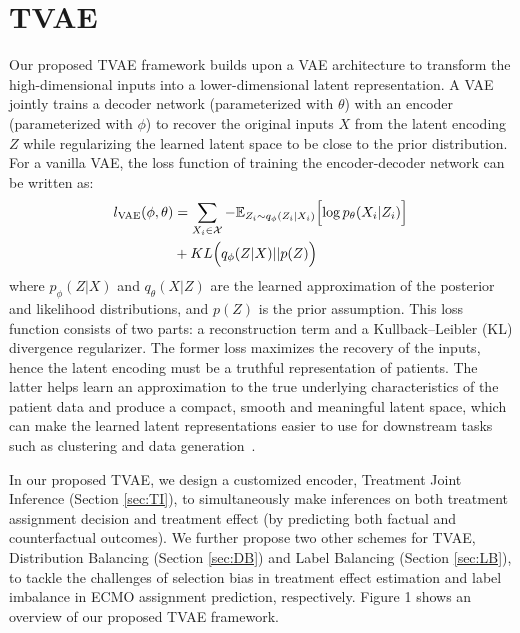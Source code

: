 

\section{TVAE}


Our proposed TVAE framework builds upon a VAE architecture to transform the high-dimensional inputs into a lower-dimensional latent representation. A VAE jointly trains a decoder network (parameterized with $\theta$) with an encoder (parameterized with $\phi$) to recover the original inputs $X$ from the latent encoding $Z$ while regularizing the learned latent space to be close to the prior distribution. For a vanilla VAE, the loss function of training the encoder-decoder network can be written as:
\begin{equation}
\label{eq:VAE}
    \begin{split}
    l_{\text{VAE}}(\phi,\theta) &= \sum_{X_i \in \mathcal{X}} -\mathbb{E}_{Z_i\sim q_{\phi}(Z_i|X_i) } \Bigl[ \log p_{\theta} (X_i|Z_i)\Bigr]  \\
    &+ KL\Bigl(q_{\phi}(Z|X) || p(Z)\Bigr) 
    \end{split}
\end{equation}
where $p_{\phi}(Z|X)$ and $q_{\theta}(X|Z)$ are the learned approximation of the posterior and likelihood distributions, and $p(Z)$ is the prior assumption. This loss function consists of two parts: a reconstruction term and a Kullback–Leibler (KL) divergence regularizer. The former loss maximizes the recovery of the inputs, hence the latent encoding must be a  truthful representation of patients. The latter helps learn an approximation to the true underlying characteristics of the patient data and produce a compact, smooth and meaningful latent space, which can make the learned latent representations easier to use for downstream tasks such as clustering and data generation~\cite{xuebingkdd}.   

In our proposed TVAE, we design a customized encoder, Treatment Joint Inference (Section \ref{sec:TI}), to simultaneously make inferences on both treatment assignment decision and treatment effect (by predicting both factual and counterfactual outcomes).
We further propose two other schemes for TVAE, Distribution Balancing (Section \ref{sec:DB}) and Label Balancing (Section \ref{sec:LB}), to tackle the challenges of selection bias in treatment effect estimation and label imbalance in ECMO assignment prediction, respectively.
Figure 1 shows an overview of our proposed TVAE framework.

